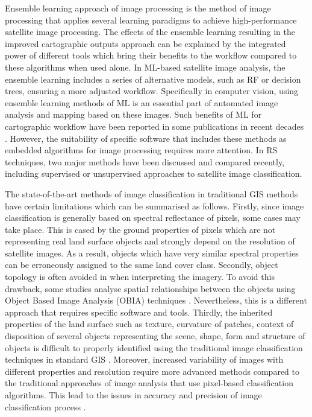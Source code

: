 \documentclass[draft]{agujournal2019}
\begin{document}
Ensemble learning approach of image processing is the method of image processing that applies several learning paradigms to achieve high-performance satellite image processing. The effects of the ensemble learning resulting in the improved cartographic outputs approach can be explained by the integrated power of different tools which bring their benefits to the workflow compared to these algorithms when used alone. In ML-based satellite image analysis, the ensemble learning includes a series of alternative models, such as RF or decision trees, ensuring a more adjusted workflow. Specifically in computer vision, using ensemble learning methods of ML is an essential part of automated image analysis and mapping based on these images. Such benefits of ML for cartographic workflow have been reported in some publications in recent decades \cite{YOO2019155,SINGH2021100624,MULIK2023106697}. However, the suitability of specific software that includes these methods as embedded algorithms for image processing requires more attention. In RS techniques, two major methods have been discussed and compared recently, including supervised \cite{GOLDBLATT2018253,MARTINEZMONTOYA2010978,INZANA200359} or unsupervised \cite{SHIH199497,Lemenkova202229,LU2023116898,Lemenkova202322} approaches to satellite image classification.

The state-of-the-art methods of image classification in traditional GIS methods have certain limitations which can be summarised as follows. Firstly, since image classification is generally based on spectral reflectance of pixels, some cases may take place. This is cased by the ground properties of pixels which are not representing real land surface objects and strongly depend on the resolution of satellite images. As a result, objects which have very similar spectral properties can be erroneously assigned to the same land cover class. Secondly, object topology is often avoided in when interpreting the imagery. To avoid this drawback, some studies analyse spatial relationships between the objects using Object Based Image Analysis (OBIA) techniques \cite{LUCIANO2019127,PHIRI2018170,DEWALI20233109,MAO202011}. Nevertheless, this is a different approach that requires specific software and tools. Thirdly, the inherited properties of the land surface such as texture, curvature of patches, context of disposition of several objects representing the scene, shape, form and structure of objects is difficult to properly identified using the traditional image classification techniques in standard GIS \cite{OUSMANOU2024100239,ZHANG2023129590,BAKR2010592}. Moreover, increased variability of images with different properties and resolution require more advanced methods compared to the traditional approaches of image analysis that use pixel-based classification algorithms. This lead to the issues in accuracy and precision of image classification process \cite{Fisher,McKee}.
\end{document}
